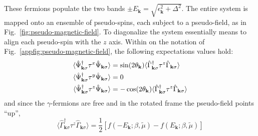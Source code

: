These fermions populate the two bands $\pm E_\mathbf{k} = \sqrt{\epsilon_\mathbf{k}^2 + \Delta^2}$. The entire system is mapped onto an ensemble of pseudo-spins, each subject to a pseudo-field, as in Fig.~\ref{fig:pseudo-magnetic-field}. To diagonalize the system essentially means to align each pseudo-spin with the $z$ axis. Within on the notation of Fig.~\ref{appfig:pseudo-magnetic-field}, the following expectations values hold:
\begin{align}
	\langle \hat \Psi_{\mathbf{k}\sigma}^\dagger \tau^x \hat \Psi_{\mathbf{k}\sigma} \rangle &= \sin \normalfont(2\theta_\mathbf{k})  \langle \hat \Gamma_{\mathbf{k}\sigma}^\dagger \tau^z \hat \Gamma_{\mathbf{k}\sigma} \rangle \label{eq:af-x-expectation}\\
	\langle \hat \Psi_{\mathbf{k}\sigma}^\dagger \tau^y \hat \Psi_{\mathbf{k}\sigma} \rangle &= 0\\
	\langle \hat \Psi_{\mathbf{k}\sigma}^\dagger \tau^z \hat \Psi_{\mathbf{k}\sigma} \rangle &= -\cos \normalfont(2\theta_\mathbf{k}) \langle \hat \Gamma_{\mathbf{k}\sigma}^\dagger \tau^z \hat \Gamma_{\mathbf{k}\sigma} \rangle \label{eq:af-z-expectation}
\end{align}
and since the $\gamma$-fermions are free and in the rotated frame the pseudo-field points ``up'',
\[
	\langle \hat \Gamma_{\mathbf{k}\sigma}^\dagger \tau^z \hat \Gamma_{\mathbf{k}\sigma} \rangle = \frac{1}{2} \left[
		f\left(
			-E_\mathbf{k};\beta,\tilde{\mu}
		\right) - f\left(
			E_\mathbf{k};\beta,\tilde{\mu}
		\right)
	\right]
\]

